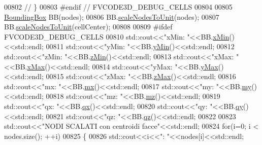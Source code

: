 \begin{DoxyCode}
00802 \textcolor{comment}{//        \}}
00803 \textcolor{preprocessor}{#endif // FVCODE3D\_DEBUG\_CELLS}
00804 
00805         \hyperlink{classFVCode3D_1_1BoundingBox}{BoundingBox} BB(nodes);
00806         BB.\hyperlink{classFVCode3D_1_1BoundingBox_a20d4281f025fd6a4ee51ec8cbc47874c}{scaleNodesToUnit}(nodes);
00807         BB.\hyperlink{classFVCode3D_1_1BoundingBox_a20d4281f025fd6a4ee51ec8cbc47874c}{scaleNodesToUnit}(cellCenter);
00808 
00809 \textcolor{preprocessor}{#ifdef FVCODE3D\_DEBUG\_CELLS}
00810         std::cout<<\textcolor{stringliteral}{"xMin: "}<<BB.\hyperlink{classFVCode3D_1_1BoundingBox_a8406e82493459d67f7c6e01c41401b01}{xMin}()<<std::endl;
00811         std::cout<<\textcolor{stringliteral}{"yMin: "}<<BB.\hyperlink{classFVCode3D_1_1BoundingBox_a8d241063de29672a73e478ccef500fcd}{yMin}()<<std::endl;
00812         std::cout<<\textcolor{stringliteral}{"zMin: "}<<BB.\hyperlink{classFVCode3D_1_1BoundingBox_a332192fde3727b7de1c9864e98659ac1}{zMin}()<<std::endl;
00813         std::cout<<\textcolor{stringliteral}{"xMax: "}<<BB.\hyperlink{classFVCode3D_1_1BoundingBox_a0ba4fbfa989d212c7f9df6b5ee440ef2}{xMax}()<<std::endl;
00814         std::cout<<\textcolor{stringliteral}{"yMax: "}<<BB.\hyperlink{classFVCode3D_1_1BoundingBox_abcec6a60efb3a0bd3333bba6cb8c5eb4}{yMax}()<<std::endl;
00815         std::cout<<\textcolor{stringliteral}{"zMax: "}<<BB.\hyperlink{classFVCode3D_1_1BoundingBox_a9b1fee0fe7324865743f4029dd06e1a3}{zMax}()<<std::endl;
00816         std::cout<<\textcolor{stringliteral}{"mx: "}<<BB.\hyperlink{classFVCode3D_1_1BoundingBox_a2afb68488fb7361595825089c271fa23}{mx}()<<std::endl;
00817         std::cout<<\textcolor{stringliteral}{"my: "}<<BB.\hyperlink{classFVCode3D_1_1BoundingBox_a286722e958824c1798a85a55325d9fe5}{my}()<<std::endl;
00818         std::cout<<\textcolor{stringliteral}{"mz: "}<<BB.\hyperlink{classFVCode3D_1_1BoundingBox_aaff1f6eb030c4f8a15dd22c79a28bf0c}{mz}()<<std::endl;
00819         std::cout<<\textcolor{stringliteral}{"qx: "}<<BB.\hyperlink{classFVCode3D_1_1BoundingBox_a6b6ca1d8e9bc92d6f5eebdb329577530}{qx}()<<std::endl;
00820         std::cout<<\textcolor{stringliteral}{"qy: "}<<BB.\hyperlink{classFVCode3D_1_1BoundingBox_ae429d21fd242df838ed0343757eba744}{qy}()<<std::endl;
00821         std::cout<<\textcolor{stringliteral}{"qz: "}<<BB.\hyperlink{classFVCode3D_1_1BoundingBox_accc6026eaa331a6075805479b60141f4}{qz}()<<std::endl;
00822 
00823         std::cout<<\textcolor{stringliteral}{"NODI SCALATI con centroidi facce"}<<std::endl;
00824         \textcolor{keywordflow}{for}(i=0; i < nodes.size(); ++i)
00825         \{
00826             std::cout<<i<<\textcolor{stringliteral}{": "}<<nodes[i]<<std::endl;

\end{DoxyCode}
